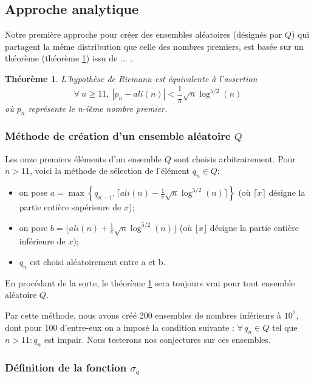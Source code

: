 \documentclass[../main.tex]{report}
\begin{document}
\theoremstyle{plain}
\newtheorem{Thm}{Théorème}

\subsection{Approche analytique}

Notre première approche pour créer des ensembles aléatoires (désignés par $Q$) qui partagent la même distribution que celle des nombres premiers, est basée sur un théorème (théorème \ref{theorem}) issu de ... . 

\begin{Thm}
\label{theorem}
	L'hypothèse de Riemann est équivalente à l'assertion 
	\[
	\forall \ n \geqslant 11, \ |p_{n} - ali(n) | < \frac{1}{\pi} \sqrt{n} \log^{5/2}(n) 
	\]
	où $p_{n}$ représente le n-ième nombre premier.
\end{Thm}

\subsubsection{Méthode de création d'un ensemble aléatoire $Q$}

Les onze premiers éléments d'un ensemble $Q$ sont choisis arbitrairement. 
Pour $ n > 11 $, voici la méthode de sélection  de l'élément $q_{n} \in Q$: 
\begin{itemize}
	\item on pose $ a = \max \left\{ q_{n-1} ,\lceil{ali(n) - \frac{1}{\pi} \sqrt{n} \log^{5/2}(n) \rceil} \right\}$ 
	(où $\lceil x \rceil$ désigne la partie entière supérieure de $x$);
	\item on pose $ b = \lfloor ali(n) + \frac{1}{\pi} \sqrt{n} \log^{5/2}(n) \rfloor $
	(où $\lfloor x \rfloor$ désigne la partie entière inférieure de $x$);
	\item $ q_{n} $ est choisi aléatoirement entre a et b. 
\end{itemize}

En procédant de la sorte, le théorème \ref{theorem} sera toujours vrai pour tout ensemble aléatoire $Q$.

Par cette méthode, nous avons créé 200 ensembles de nombres inférieurs à $10^{7}$, dont pour 100 d'entre-eux on a imposé la condition suivante : $\forall \, q_{n} \in Q$ tel que  $n > 11 : q_{n}$ est impair. Nous testerons nos conjectures sur ces ensembles.

\subsubsection{Définition de la fonction $\sigma_{q}$}
\end{document}
